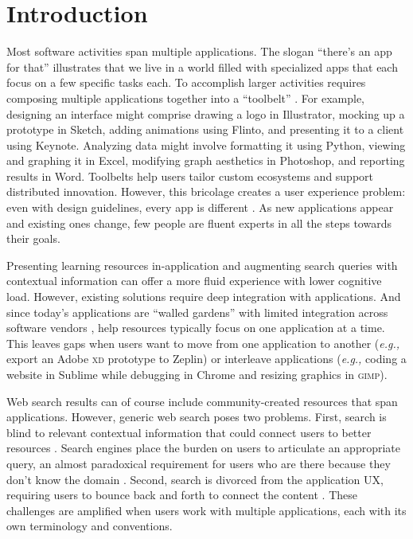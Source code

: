 \section{Introduction}
Most software activities span multiple applications. The slogan ``there's an app for that'' illustrates that we live in a world filled with specialized apps that each focus on a few specific tasks each. To accomplish larger activities requires composing multiple applications together into a ``toolbelt'' \cite{Sumner1997}. For example, designing an interface might comprise drawing a logo in Illustrator, mocking up a prototype in Sketch, adding animations using Flinto, and presenting it to a client using Keynote. Analyzing data might involve formatting it using Python, viewing and graphing it in Excel, modifying graph aesthetics in Photoshop, and reporting results in Word. Toolbelts help users tailor custom ecosystems and support distributed innovation. However, this bricolage creates a user experience problem: even with design guidelines, every app is different \cite{Beaudouin-Lafon2018}. As new applications appear and existing ones change, few people are fluent experts in all the steps towards their goals.

Presenting learning resources in-application \cite{Grossman2010a, Chilana2012, Matejka2011a, Matejka2011, Brandt2010, Ichinco2017} and augmenting search queries with contextual information \cite{Ekstrand2011, Brandt2010} can offer a more fluid experience with lower cognitive load. However, existing solutions require deep integration with applications. And since today's applications are ``walled gardens''  with limited integration across software vendors \cite{Beaudouin-Lafon2018}, help resources typically focus on one application at a time. This leaves gaps when users want to move from one application to another (\textit{e.g.,} export an Adobe \textsc{xd} prototype to Zeplin) or interleave applications (\textit{e.g.,} coding a website in Sublime while debugging in Chrome and resizing graphics in \textsc{gimp}). 

Web search results can of course include community-created resources that span applications. However, generic web search poses two problems. First, search is blind to relevant contextual information that could connect users to better resources \cite{Ekstrand2011, Kraft2005, Finkelstein2002}. Search engines place the burden on users to articulate an appropriate query, an almost paradoxical requirement for users who are there because they don't know the domain \cite{Russell2011}.  Second, search is divorced from the application UX, requiring users to bounce back and forth to connect the content \cite{Fourney2014}. These challenges are amplified when users work with multiple applications, each with its own terminology and conventions.

